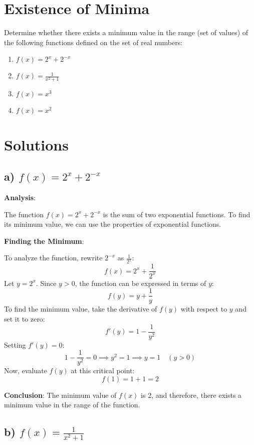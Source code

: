 \documentclass[12pt]{article}
\begin{document}
\section*{Existence of Minima}

Determine whether there exists a minimum value in the range (set of values) of the following functions defined on the set of real numbers:

\begin{enumerate}
    \item \( f(x) = 2^x + 2^{-x} \)
    \item \( f(x) = \frac{1}{x^2 + 1} \)
    \item \( f(x) = x^3 \)
    \item \( f(x) = x^2 \)
\end{enumerate}

\section*{Solutions}

\subsection*{a) \( f(x) = 2^x + 2^{-x} \)}

\textbf{Analysis}:

The function \( f(x) = 2^x + 2^{-x} \) is the sum of two exponential functions. To find its minimum value, we can use the properties of exponential functions.

\textbf{Finding the Minimum}:

To analyze the function, rewrite \( 2^{-x} \) as \( \frac{1}{2^x} \):
\[
f(x) = 2^x + \frac{1}{2^x}
\]
Let \( y = 2^x \). Since \( y > 0 \), the function can be expressed in terms of \( y \):
\[
f(y) = y + \frac{1}{y}
\]
To find the minimum value, take the derivative of \( f(y) \) with respect to \( y \) and set it to zero:
\[
f'(y) = 1 - \frac{1}{y^2}
\]
Setting \( f'(y) = 0 \):
\[
1 - \frac{1}{y^2} = 0 \implies y^2 = 1 \implies y = 1 \quad (y > 0)
\]
Now, evaluate \( f(y) \) at this critical point:
\[
f(1) = 1 + 1 = 2
\]

\textbf{Conclusion}: The minimum value of \( f(x) \) is 2, and therefore, there exists a minimum value in the range of the function.

\subsection*{b) \( f(x) = \frac{1}{x^2 + 1} \)}
\end{document}
